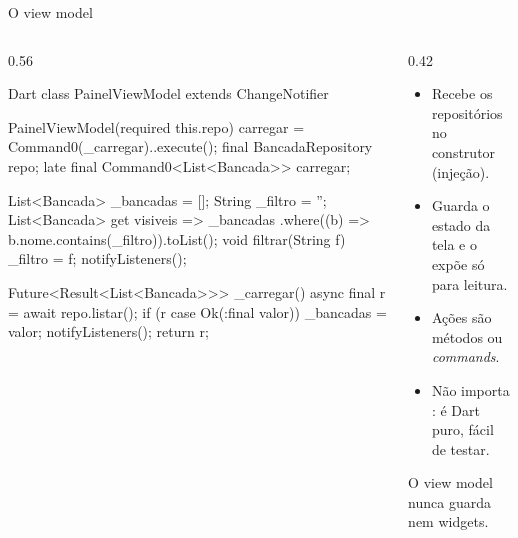 \documentclass[aspectratio=169,10pt]{beamer}
\begin{document}
\begin{frame}[fragile]{O view model}
  \begin{columns}[T]
    \begin{column}{0.56\textwidth}
\begin{codigo}[title=ui/painel/view\_models/painel\_view\_model.dart]{Dart}
class PainelViewModel extends ChangeNotifier {
  PainelViewModel({required this.repo}) {
    carregar = Command0(_carregar)..execute();
  }
  final BancadaRepository repo;
  late final Command0<List<Bancada>> carregar;

  List<Bancada> _bancadas = [];  String _filtro = '';
  List<Bancada> get visiveis => _bancadas
      .where((b) => b.nome.contains(_filtro)).toList();
  void filtrar(String f) { _filtro = f; notifyListeners(); }

  Future<Result<List<Bancada>>> _carregar() async {
    final r = await repo.listar();
    if (r case Ok(:final valor)) _bancadas = valor;
    notifyListeners();
    return r;
  }
}
\end{codigo}
    \end{column}
    \begin{column}{0.42\textwidth}
      \small
      \begin{itemize}
        \item Recebe os repositórios no construtor (injeção).
        \item Guarda o estado da tela e o expõe só para leitura.
        \item Ações são métodos ou \emph{commands}.
        \item Não importa : é Dart puro, fácil de testar.
      \end{itemize}
      \begin{atencao}
        O view model nunca guarda  nem widgets.
      \end{atencao}
    \end{column}
  \end{columns}
\end{frame}
\end{document}
